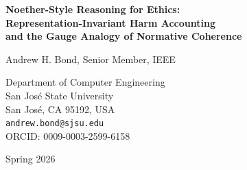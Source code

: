 \documentclass[12pt,letterpaper]{article}
\theoremstyle{definition}
\theoremstyle{remark}
\begin{document}
\begin{titlepage}
\centering
\vspace*{2cm}

{\LARGE\bfseries Noether-Style Reasoning for Ethics:\\Representation-Invariant Harm Accounting\\and the Gauge Analogy of Normative Coherence}

\vspace{1.5cm}

{\Large Andrew H. Bond, Senior Member, IEEE}

\vspace{0.5cm}

{\large
Department of Computer Engineering\\
San Jos\'e State University\\
San Jos\'e, CA 95192, USA\\[0.3cm]
\texttt{andrew.bond@sjsu.edu}\\[0.3cm]
ORCID: 0009-0003-2599-6158
}

\vspace{1cm}

{\large Spring 2026}

\vspace{2cm}


\end{titlepage}
\end{document}
